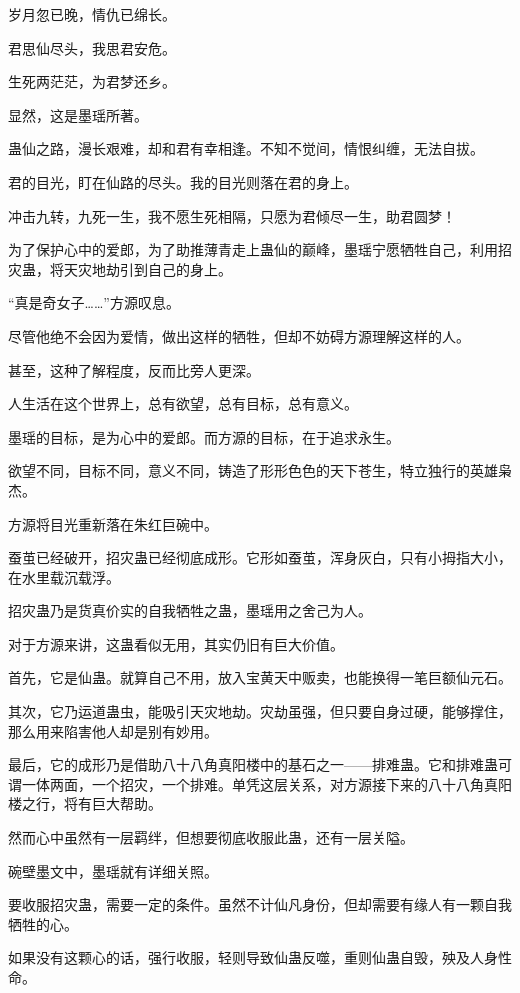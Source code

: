 \begin{this_body}
岁月忽已晚，情仇已绵长。

君思仙尽头，我思君安危。

生死两茫茫，为君梦还乡。

显然，这是墨瑶所著。

蛊仙之路，漫长艰难，却和君有幸相逢。不知不觉间，情恨纠缠，无法自拔。

君的目光，盯在仙路的尽头。我的目光则落在君的身上。

冲击九转，九死一生，我不愿生死相隔，只愿为君倾尽一生，助君圆梦！

为了保护心中的爱郎，为了助推薄青走上蛊仙的巅峰，墨瑶宁愿牺牲自己，利用招灾蛊，将天灾地劫引到自己的身上。

“真是奇女子……”方源叹息。

尽管他绝不会因为爱情，做出这样的牺牲，但却不妨碍方源理解这样的人。

甚至，这种了解程度，反而比旁人更深。

人生活在这个世界上，总有欲望，总有目标，总有意义。

墨瑶的目标，是为心中的爱郎。而方源的目标，在于追求永生。

欲望不同，目标不同，意义不同，铸造了形形色色的天下苍生，特立独行的英雄枭杰。

方源将目光重新落在朱红巨碗中。

蚕茧已经破开，招灾蛊已经彻底成形。它形如蚕茧，浑身灰白，只有小拇指大小，在水里载沉载浮。

招灾蛊乃是货真价实的自我牺牲之蛊，墨瑶用之舍己为人。

对于方源来讲，这蛊看似无用，其实仍旧有巨大价值。

首先，它是仙蛊。就算自己不用，放入宝黄天中贩卖，也能换得一笔巨额仙元石。

其次，它乃运道蛊虫，能吸引天灾地劫。灾劫虽强，但只要自身过硬，能够撑住，那么用来陷害他人却是别有妙用。

最后，它的成形乃是借助八十八角真阳楼中的基石之一——排难蛊。它和排难蛊可谓一体两面，一个招灾，一个排难。单凭这层关系，对方源接下来的八十八角真阳楼之行，将有巨大帮助。

然而心中虽然有一层羁绊，但想要彻底收服此蛊，还有一层关隘。

碗壁墨文中，墨瑶就有详细关照。

要收服招灾蛊，需要一定的条件。虽然不计仙凡身份，但却需要有缘人有一颗自我牺牲的心。

如果没有这颗心的话，强行收服，轻则导致仙蛊反噬，重则仙蛊自毁，殃及人身性命。


\end{this_body}
